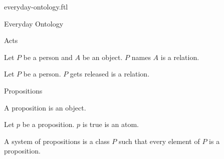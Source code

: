 \documentclass{naproche-library}
\begin{document}
\begin{smodule}{everyday-ontology.ftl}
\begin{sfragment}{Everyday Ontology}
  \begin{sfragment}{Acts}
    \begin{signature*}[forthel]
      Let $P$ be a person and $A$ be an object.
      $P$ names $A$ is a relation.
    \end{signature*}

    \begin{signature*}[forthel]
      Let $P$ be a person.
      $P$ gets released is a relation.
    \end{signature*}
  \end{sfragment}

  \begin{sfragment}{Propositions}
    \begin{signature*}[forthel]
      A proposition is an object.
    \end{signature*}

    \begin{signature*}[forthel]
      Let $p$ be a proposition.
      $p$ is true is an atom.
    \end{signature*}

    \begin{definition*}[forthel]
      A system of propositions is a class $P$ such that every element of $P$ is a proposition.
    \end{definition*}
  \end{sfragment}
\end{sfragment}
\end{smodule}
\end{document}
